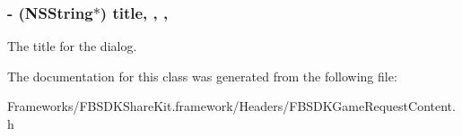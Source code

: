 \subsubsection[{title}]{\setlength{\rightskip}{0pt plus 5cm}-\/ (N\+S\+String$\ast$) title\hspace{0.3cm}{\ttfamily [read]}, {\ttfamily [write]}, {\ttfamily [nonatomic]}, {\ttfamily [copy]}}\label{interface_f_b_s_d_k_game_request_content_ae626589f2d4e7d36444d34a819989cef}
The title for the dialog. 

The documentation for this class was generated from the following file\+:\begin{DoxyCompactItemize}
\item 
Frameworks/\+F\+B\+S\+D\+K\+Share\+Kit.\+framework/\+Headers/F\+B\+S\+D\+K\+Game\+Request\+Content.\+h\end{DoxyCompactItemize}
